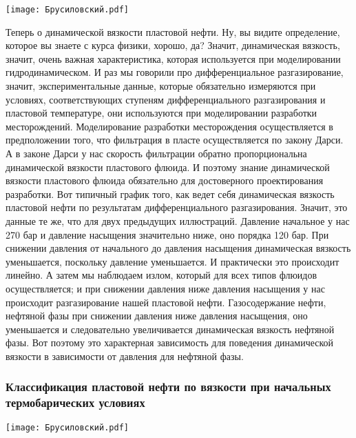 \documentclass[main.tex]{subfiles}
\begin{document}
\begin{center}
\texttt{[image: Брусиловский.pdf]}
\end{center}

Теперь о динамической вязкости пластовой нефти.
Ну, вы видите определение, которое вы знаете с курса физики, хорошо, да?
Значит, динамическая вязкость, значит, очень важная характеристика, которая используется при моделировании гидродинамическом.
И раз мы говорили про дифференциальное разгазирование, значит, экспериментальные данные, которые обязательно измеряются при условиях, соответствующих ступеням дифференциального разгазирования и пластовой температуре, они используются при моделировании разработки месторождений.
Моделирование разработки месторождения осуществляется в предположении того, что фильтрация в пласте осуществляется по закону Дарси.
А в законе Дарси у нас скорость фильтрации обратно пропорциональна динамической вязкости пластового флюида.
И поэтому знание динамической вязкости пластового флюида обязательно для достоверного проектирования разработки.
Вот типичный график того, как ведет себя динамическая вязкость пластовой нефти по результатам дифференциального разгазирования.
Значит, это данные те же, что для двух предыдущих иллюстраций.
Давление начальное у нас 270 бар и давление насыщения значительно ниже, оно порядка 120 бар.
При снижении давления от начального до давления насыщения динамическая вязкость уменьшается, поскольку давление уменьшается.
И практически это происходит линейно.
А затем мы наблюдаем излом, который для всех типов флюидов осуществляется; и при снижении давления ниже давления насыщения у нас происходит разгазирование нашей пластовой нефти.
Газосодержание нефти, нефтяной фазы при снижении давления ниже давления насыщения, оно уменьшается и следовательно увеличивается динамическая вязкость нефтяной фазы.
Вот поэтому это характерная зависимость для поведения динамической вязкости в зависимости от давления для нефтяной фазы.

\subsubsection{Классификация пластовой нефти по вязкости при начальных термобарических условиях}

\begin{center}
\texttt{[image: Брусиловский.pdf]}
\end{center}
\end{document}
